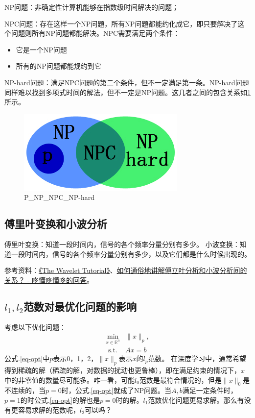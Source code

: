 NP问题：非确定性计算机能够在指数级时间解决的问题；

NPC问题：存在这样一个NP问题，所有NP问题都能约化成它，即只要解决了这个问题则所有NP问题都能解决。NPC需要满足两个条件：
\begin{itemize}
	\item 它是一个NP问题
	\item 所有的NP问题都能规约到它
\end{itemize}

NP-hard问题：满足NPC问题的第二个条件，但不一定满足第一条。NP-hard问题同样难以找到多项式时间的解法，但不一定是NP问题。这几者之间的包含关系如\ref{fig:P-NP-NPC-NP-hard}所示。

\begin{figure}[h]
	\centering
	\includegraphics[width=.4\textwidth]{pics/P-NP-NPC-NP-hard.jpeg}
	\caption{P\_NP\_NPC\_NP-hard}
	\label{fig:P-NP-NPC-NP-hard}
\end{figure}



\subsection{傅里叶变换和小波分析}
傅里叶变换：知道一段时间内，信号的各个频率分量分别有多少。
小波变换：知道一段时间内，信号的各个频率分量分别有多少，以及它们都是什么时候出现的。

参考资料：\href{https://cseweb.ucsd.edu/~baden/Doc/wavelets/polikar_wavelets.pdf}{《The Wavelet Tutorial》}、\href{https://www.zhihu.com/question/22864189/answer/40772083}{如何通俗地讲解傅立叶分析和小波分析间的关系？ - 咚懂咚懂咚的回答}。

\subsection{$l_1, l_2$范数对最优化问题的影响}
考虑以下优化问题：
\begin{equation}
	\begin{aligned}
		\min _{x \in \mathbb{R}^{n}} &\|x\|_{p}, \\
		\text { s.t. } & A x=b \label{eq-opt}
	\end{aligned}
\end{equation}
公式.\ref{eq-opt}中$p$表示0，1，2，$\|x\|_{p}$表示$x$的$l_p$范数。
在深度学习中，通常希望得到稀疏的解（稀疏的解，对数据的扰动也更鲁棒），即在满足约束的情况下，$x$中的非零值的数量尽可能多。咋一看，可能$l_0$范数是最符合情况的，但是$\|x\|_0$是不连续的，当$p=0$时，公式.\ref{eq-opt}就成了NP问题。当$A, b$满足一定条件时，$p=1$的时公式.\ref{eq-opt}的解也是$p=0$时的解。$l_1$范数优化问题更易求解。那么有没有更容易求解的范数呢，$l_2$可以吗？

